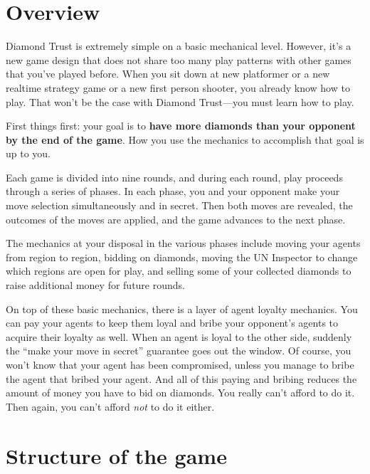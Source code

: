 \documentclass[8pt]{extbook}
\begin{document}
\makeatletter
\renewcommand\@endpart{\standardEndPart}
\makeatother





\section{Overview}
Diamond Trust is extremely simple on a basic mechanical level.  However, it's a new game design that does not share too many play patterns with other games that you've played before.  When you sit down at new platformer or a new realtime strategy game or a new first person shooter, you already know how to play.  That won't be the case with Diamond Trust---you must learn how to play.

First things first:  your goal is to {\bf have more diamonds than your opponent by the end of the game}.  How you use the mechanics to accomplish that goal is up to you.

Each game is divided into nine rounds, and during each round, play proceeds through a series of phases.  In each phase, you and your opponent make your move selection simultaneously and in secret.  Then both moves are revealed, the outcomes of the moves are applied, and the game advances to the next phase.

The mechanics at your disposal in the various phases include moving your agents from region to region, bidding on diamonds, moving the UN Inspector to change which regions are open for play, and selling some of your collected diamonds to raise additional money for future rounds.

On top of these basic mechanics, there is a layer of agent loyalty mechanics.  You can pay your agents to keep them loyal and bribe your opponent's agents to acquire their loyalty as well.  When an agent is loyal to the other side, suddenly the ``make your move in secret'' guarantee goes out the window.  Of course, you won't know that your agent has been compromised, unless you manage to bribe the agent that bribed your agent.  And all of this paying and bribing reduces the amount of money you have to bid on diamonds.  You really can't afford to do it.  Then again, you can't afford {\it not} to do it either.

\section{Structure of the game}
\end{document}

